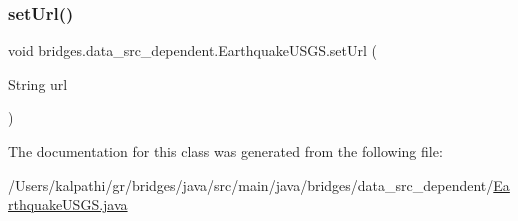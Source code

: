 \subsubsection{\texorpdfstring{setUrl()}{setUrl()}}
{\footnotesize\ttfamily void bridges.\+data\+\_\+src\+\_\+dependent.\+Earthquake\+U\+S\+G\+S.\+set\+Url (\begin{DoxyParamCaption}\item[{String}]{url }\end{DoxyParamCaption})}



The documentation for this class was generated from the following file\+:\begin{DoxyCompactItemize}
\item 
/\+Users/kalpathi/gr/bridges/java/src/main/java/bridges/data\+\_\+src\+\_\+dependent/\mbox{\hyperlink{_earthquake_u_s_g_s_8java}{Earthquake\+U\+S\+G\+S.\+java}}\end{DoxyCompactItemize}

